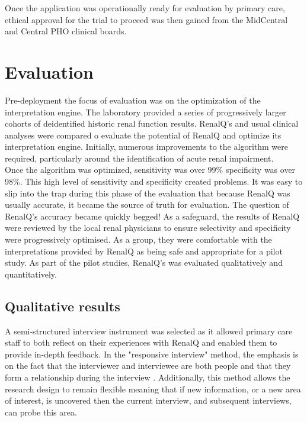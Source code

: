 \documentclass[11pt]{article}
\begin{document}
Once the application was operationally ready for evaluation by primary care, ethical approval for the trial to proceed was then gained from the MidCentral and Central PHO clinical boards. \\

\section{Evaluation}
Pre-deployment the focus of evaluation was on the optimization of the interpretation engine. The laboratory provided a series of progressively larger cohorts of deidentified historic renal function results. RenalQ's and usual clinical analyses were compared o evaluate the potential of RenalQ and optimize its interpretation engine.  Initially, numerous improvements to the algorithm were required, particularly around the identification of acute renal impairment. \\

Once the algorithm was optimized, sensitivity was over 99\% specificity was over 98\%. This high level of sensitivity and specificity created problems. It was easy to slip into the trap during this phase of the evaluation that because RenalQ was usually accurate, it became the source of truth for evaluation. The question of RenalQ's accuracy became quickly begged! As a safeguard, the results of RenalQ were reviewed by the local renal physicians to ensure selectivity and specificity were progressively optimised. As a group, they were comfortable with the interpretations provided by RenalQ as being safe and appropriate for a pilot study. As part of the pilot studies, RenalQ's was evaluated qualitatively and quantitatively. \\

\subsection{Qualitative results}
A semi-structured interview instrument was selected as it allowed primary care staff to both reflect on their experiences with RenalQ and enabled them to provide in-depth feedback. In the "responsive interview" method, the emphasis is on the fact that the interviewer and interviewee are both people and that they form a relationship during the interview \citep{rubin2011qualitative}. Additionally, this method allows the research design to remain flexible meaning that if new information, or a new area of interest, is uncovered then the current interview, and subsequent interviews, can probe this area. \\
\end{document}
